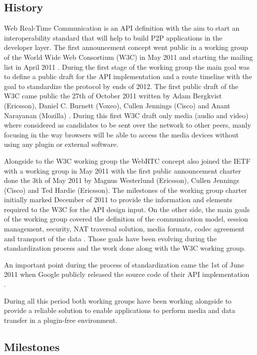 \subsection{History}

Web Real-Time Communication is an API definition with the aim to start an interoperability standard that will help to build P2P applications in the developer layer. The first announcement concept went public in a working group of the World Wide Web Consortium (W3C) in May 2011 \cite{webrtcW3cgroup} and starting the mailing list in April 2011 \cite{welcomeW3C}. During the first stage of the working group the main goal was to define a public draft for the API implementation and a route timeline with the goal to standardize the protocol by ends of 2012. The first public draft of the W3C came public the 27th of October 2011 written by Adam Bergkvist (Ericsson), Daniel C. Burnett (Voxeo), Cullen Jennings (Cisco) and Anant Narayanan (Mozilla) \cite{originalW3Cdraft}. During this first W3C draft only media (audio and video) where considered as candidates to be sent over the network to other peers, manly focusing in the way browsers will be able to access the media devices without using any plugin or external software.

Alongside to the W3C working group the WebRTC concept also joined the IETF with a working group in May 2011 \cite{webrtcIETFgroup} with the first public announcement charter done the 3th of May 2011 by Magnus Westerlund (Ericsson), Cullen Jennings (Cisco) and Ted Hardie (Ericsson). The milestones of the working group charter initially marked December of 2011 to provide the information and elements required to the W3C for the API design input. On the other side, the main goals of the working group covered the definition of the communication model, session management, security, NAT traversal solution, media formats, codec agreement and transport of the data \cite{webrtcIETFcharter}. Those goals have been evolving during the standardization process and the work done along with the W3C working group.

An important point during the process of standardization came the 1st of June 2011 when Google publicly released the source code of their API implementation \cite{haraldpublicWebRTC}. 

During all this period both working groups have been working alongside to provide a reliable solution to enable applications to perform media and data transfer in a plugin-free environment.

\subsection{Milestones}

